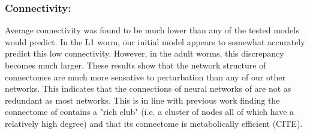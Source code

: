 \subsubsection{Connectivity:} Average connectivity was found to be much lower than any of the tested models would predict. 
In the L1 worm, our initial model appears to somewhat accurately predict this low connectivity. 
However, in the adult worms, this discrepancy becomes much larger. 
These results show that the network structure of \ce connectomes are much more sensative to perturbation than any of our other networks.
This indicates that the connections of neural networks of \ce are not as redundant as most networks. 
This is in line with previous work finding the connectome of \ce contains a "rich club" (i.e. a cluster of nodes all of which have a relatively high degree) and that its connectome is metabolically efficient (CITE).
